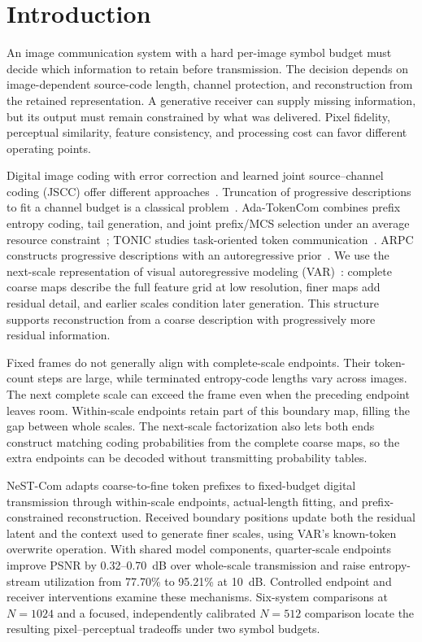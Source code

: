 \section{Introduction}
An image communication system with a hard per-image symbol budget must decide which information to retain before transmission. The decision depends on image-dependent source-code length, channel protection, and reconstruction from the retained representation. A generative receiver can supply missing information, but its output must remain constrained by what was delivered. Pixel fidelity, perceptual similarity, feature consistency, and processing cost can favor different operating points.

Digital image coding with error correction and learned joint source--channel coding (JSCC) offer different approaches~\cite{deepjscc,swinjscc}. Truncation of progressive descriptions to fit a channel budget is a classical problem~\cite{chande}. Ada-TokenCom combines prefix entropy coding, tail generation, and joint prefix/MCS selection under an average resource constraint~\cite{adatokencom}; TONIC studies task-oriented token communication~\cite{tonic}. ARPC constructs progressive descriptions with an autoregressive prior~\cite{arpc}. We use the next-scale representation of visual autoregressive modeling (VAR)~\cite{var}: complete coarse maps describe the full feature grid at low resolution, finer maps add residual detail, and earlier scales condition later generation. This structure supports reconstruction from a coarse description with progressively more residual information.

Fixed frames do not generally align with complete-scale endpoints. Their token-count steps are large, while terminated entropy-code lengths vary across images. The next complete scale can exceed the frame even when the preceding endpoint leaves room. Within-scale endpoints retain part of this boundary map, filling the gap between whole scales. The next-scale factorization also lets both ends construct matching coding probabilities from the complete coarse maps, so the extra endpoints can be decoded without transmitting probability tables.

NeST-Com adapts coarse-to-fine token prefixes to fixed-budget digital transmission through within-scale endpoints, actual-length fitting, and prefix-constrained reconstruction. Received boundary positions update both the residual latent and the context used to generate finer scales, using VAR's known-token overwrite operation. With shared model components, quarter-scale endpoints improve PSNR by 0.32--0.70~dB over whole-scale transmission and raise entropy-stream utilization from 77.70\% to 95.21\% at 10~dB. Controlled endpoint and receiver interventions examine these mechanisms. Six-system comparisons at $N=1024$ and a focused, independently calibrated $N=512$ comparison locate the resulting pixel--perceptual tradeoffs under two symbol budgets.
